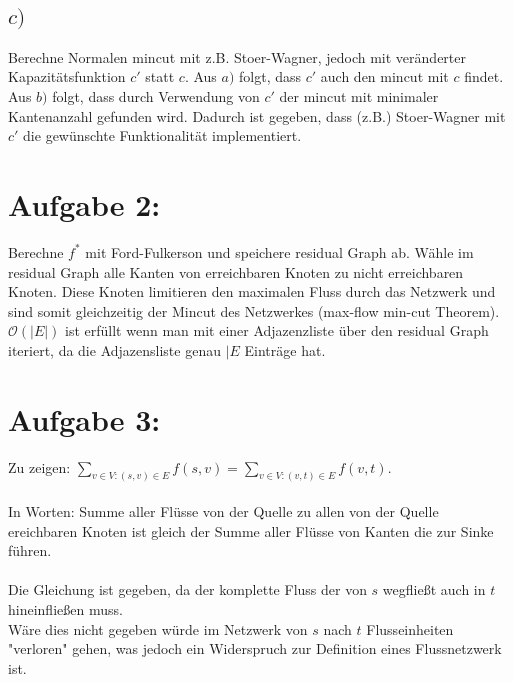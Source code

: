 \documentclass[a4paper]{scrartcl}
\begin{document}
	\subsection*{$c)$}
	Berechne Normalen mincut mit z.B. Stoer-Wagner, jedoch mit veränderter Kapazitätsfunktion $c'$ statt $c$. Aus $a)$ folgt, dass $c'$ auch den mincut mit $c$ findet. Aus $b)$ folgt, dass durch Verwendung von $c'$ der mincut mit minimaler Kantenanzahl gefunden wird. Dadurch ist gegeben, dass (z.B.) Stoer-Wagner mit $c'$ die gewünschte Funktionalität implementiert.

	\newpage
	
	\section*{Aufgabe 2:}
	Berechne $f^*$ mit Ford-Fulkerson und speichere residual Graph ab. Wähle im residual Graph alle Kanten von erreichbaren Knoten zu nicht erreichbaren Knoten. Diese Knoten limitieren den maximalen Fluss durch das Netzwerk und sind somit gleichzeitig der Mincut des Netzwerkes (max-flow min-cut Theorem).\\
	$\mathcal{O}(|E|)$ ist erfüllt wenn man mit einer Adjazenzliste über den residual Graph iteriert, da die Adjazensliste genau $|E$ Einträge hat. 
	
	\section*{Aufgabe 3:}	
	Zu zeigen: $\sum_{v \in V: (s, v) \in E} f(s,v) = \sum_{v \in V: (v, t) \in E} f(v,t)$.\\
	~\\
	In Worten: Summe aller Flüsse von der Quelle zu allen von der Quelle ereichbaren Knoten ist gleich der Summe aller Flüsse von Kanten die zur Sinke führen.\\
	~\\
	Die Gleichung ist gegeben, da der komplette Fluss der von $s$ wegfließt auch in $t$ hineinfließen muss.\\
	Wäre dies nicht gegeben würde im Netzwerk von $s$ nach $t$ Flusseinheiten "verloren" gehen, was jedoch ein Widerspruch zur Definition eines Flussnetzwerk ist.
	
	
	
	
	
	
	
	
	
	
	
	
	
	
\end{document}
